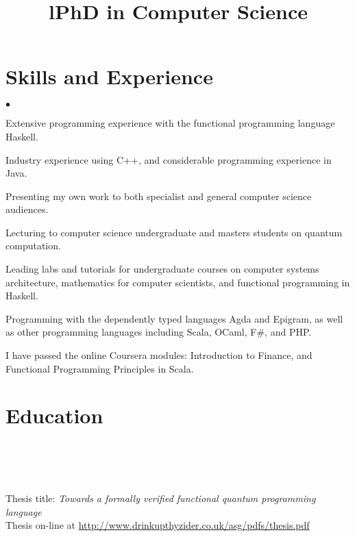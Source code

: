 \documentclass[line]{res}
\newenvironment{list2}{
  \begin{list}{$\bullet$}{%
      \setlength{\itemsep}{0in}
      \setlength{\parsep}{0.045in} \setlength{\parskip}{0in}
      \setlength{\topsep}{0in} \setlength{\partopsep}{0in}
      \setlength{\leftmargin}{0.2in}}}{\end{list}}
\begin{document}
\begin{resume}
\vspace{-4mm}
\section{\sc Skills and Experience}
\begin{list2}
\item Extensive programming experience with the functional programming
  language Haskell.
\item Industry experience using C++, and considerable programming
  experience in Java.
\item Presenting my own work to both specialist and general computer
  science audiences.
\item Lecturing to computer science undergraduate and masters students
  on quantum computation. 
\item Leading labs and tutorials for undergraduate courses on computer
  systems architecture, mathematics for computer scientists, and
  functional programming in Haskell.
\item Programming with the dependently typed languages Agda and
  Epigram, as well as other programming languages including Scala,
  OCaml, F\#, and PHP.
\item I have passed the online Coursera modules: Introduction to
  Finance, and Functional Programming Principles in Scala.
\end{list2}

\vspace{-4mm}
\section{\sc Education}
\begin{format}
\title{l}\\
\\
\body\\
\end{format}

 \location{}
\title{\bf{PhD in Computer Science}}
\begin{position}
Thesis title: 
{\em Towards a formally verified functional quantum programming
  language}\\
Thesis on-line at
 \url{http://www.drinkupthyzider.co.uk/asg/pdfs/thesis.pdf}\\
\vspace{-4mm}


\end{position}
\end{resume}
\end{document}
